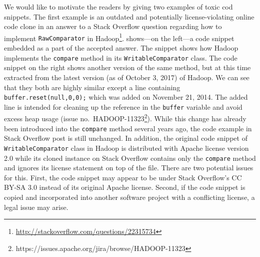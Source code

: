 \documentclass[10pt,journal,compsoc]{IEEEtran}
\begin{document}
We would like to motivate the readers by giving two examples of toxic
cod snippets.
The first example is an outdated and potentially license-violating online code clone in an
answer to a Stack Overflow question regarding how to implement
{\small{\texttt{RawComparator}}} in
\textsf{Hadoop}\footnote{\url{http://stackoverflow.com/questions/22315734}}.
 shows---on the left---a code snippet embedded as a part
of the accepted answer. The snippet shows how \textsf{Hadoop} implements the
{\small{\texttt{compare}}} method in its {\small{\texttt{WritableComparator}}}
class. The code snippet on the right shows another version of the same method,
but at this time extracted from the latest version (as of October 3, 2017) of
\textsf{Hadoop}. We can see that they both are highly similar except a line
containing {\small{\verb|buffer.reset(null,0,0);|}} which was added on November
21, 2014. The added line is intended for cleaning up the reference in the
{\small{\verb|buffer|}} variable and avoid excess heap usage
(issue no.~HADOOP-11323\footnote{https://issues.apache.org/jira/browse/HADOOP-11323}).
While this change has already been introduced into the
{\small{\texttt{compare}}} method several years ago, the code example in Stack
Overflow post is still unchanged. 
In addition, the original code snippet of
{\small\texttt{WritableComparator}} class in Hadoop is distributed with Apache license
version 2.0 while its cloned instance on Stack Overflow contains only the
{\small{\texttt{compare}}} method and ignores its license statement on top of the
file. There are two potential issues for this. First, the code snippet may appear to be 
under Stack Overflow's CC BY-SA 3.0 instead of its original Apache
license. Second, if the code snippet is copied and incorporated into another
software project with a conflicting license, a legal issue may arise.
\end{document}
